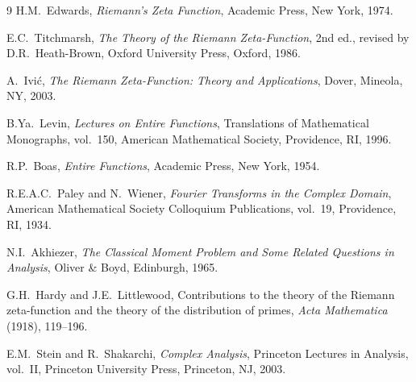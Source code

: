 \documentclass{article}
\newcommand{\tmem}[1]{{\em #1\/}}
\newcommand{\tmtextbf}[1]{\text{{\bfseries{#1}}}}
\begin{document}
\begin{thebibliography}{9}
  {}H.{\hspace{0.17em}}M.~Edwards, {\tmem{Riemann's Zeta
  Function}}, Academic Press, New York, 1974.
  
  {}E.{\hspace{0.17em}}C.~Titchmarsh, {\tmem{The Theory of
  the Riemann Zeta-Function}}, 2nd ed., revised by
  D.{\hspace{0.17em}}R.~Heath-Brown, Oxford University Press, Oxford, 1986.
  
  {}A.~Ivi{\'c}, {\tmem{The Riemann Zeta-Function: Theory and
  Applications}}, Dover, Mineola, NY, 2003.
  
  {}B.{\hspace{0.17em}}Ya.~Levin, {\tmem{Lectures on Entire
  Functions}}, Translations of Mathematical Monographs, vol.~150, American
  Mathematical Society, Providence, RI, 1996.
  
  {}R.{\hspace{0.17em}}P.~Boas, {\tmem{Entire Functions}},
  Academic Press, New York, 1954.
  
  {}R.{\hspace{0.17em}}E.{\hspace{0.17em}}A.{\hspace{0.17em}}C.~Paley
  and N.~Wiener, {\tmem{Fourier Transforms in the Complex Domain}}, American
  Mathematical Society Colloquium Publications, vol.~19, Providence, RI, 1934.
  
  {}N.{\hspace{0.17em}}I.~Akhiezer, {\tmem{The Classical
  Moment Problem and Some Related Questions in Analysis}}, Oliver \& Boyd,
  Edinburgh, 1965.
  
  {}G.{\hspace{0.17em}}H.~Hardy and
  J.{\hspace{0.17em}}E.~Littlewood, Contributions to the theory of the Riemann
  zeta-function and the theory of the distribution of primes, {\tmem{Acta
  Mathematica}} \tmtextbf{41} (1918), 119--196.
  
  {}E.{\hspace{0.17em}}M.~Stein and R.~Shakarchi,
  {\tmem{Complex Analysis}}, Princeton Lectures in Analysis, vol.~II,
  Princeton University Press, Princeton, NJ, 2003.
\end{thebibliography}
\end{document}
